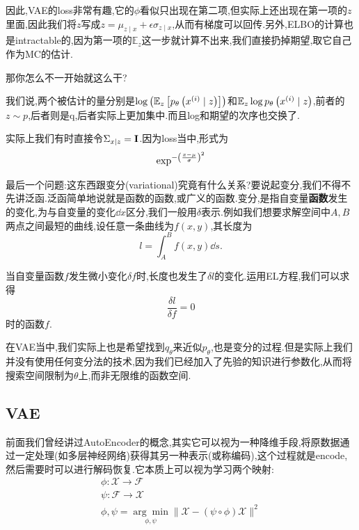	因此,VAE的loss非常有趣,它的$\phi$看似只出现在第二项,但实际上还出现在第一项的$z$里面,因此我们将$z$写成$z=\mu_{z \mid x}+\epsilon \sigma_{z \mid x}$,从而有梯度可以回传.另外,ELBO的计算也是intractable的,因为第一项的$\mathbb{E}_{z}$这一步就计算不出来,我们直接扔掉期望,取它自己作为MC的估计.
	
	那你怎么不一开始就这么干?
	
	我们说,两个被估计的量分别是$\log\left( \mathbb{E}_z \left[ p_{\theta} \left( x^{(i)}  \mid z\right)\right]\right)$和$\mathbb{E}_{z} \log p_{\theta} \left( x^{(i)}\mid z\right)$,前者的$z \sim p$,后者则是q,后者实际上更加集中.而且log和期望的次序也交换了.
	
	实际上我们有时直接令$\Sigma_{x \mid z} = \bold{I}$.因为loss当中,形式为
	\begin{equation}
		\exp^{-\left( \frac{x - \mu}{\sigma}\right)^2}
	\end{equation}
	
	最后一个问题:这东西跟变分(variational)究竟有什么关系?要说起变分,我们不得不先讲泛函.泛函简单地说就是函数的函数,或广义的函数.变分,是指自变量\textbf{函数}发生的变化,为与自变量的变化$\dd x$区分,我们一般用$\delta$表示.例如我们想要求解空间中$A, B$两点之间最短的曲线,设任意一条曲线为$f(x, y)$,其长度为
	\begin{equation}
		l = \int_{A}^{B} f(x,  y) \dd s.
	\end{equation}

	当自变量函数$f$发生微小变化$\delta f$时,长度也发生了$\delta l$的变化.运用EL方程,我们可以求得
	\begin{equation}
		\frac{\delta l}{\delta f} = 0
	\end{equation}
	时的函数$f$.
	
	在VAE当中,我们实际上也是希望找到$q_\theta$来近似$p_{\theta}$,也是变分的过程.但是实际上我们并没有使用任何变分法的技术,因为我们已经加入了先验的知识进行参数化,从而将搜索空间限制为$\theta$上,而非无限维的函数空间.
	
	
	\subsection{VAE}
	
	前面我们曾经讲过AutoEncoder的概念,其实它可以视为一种降维手段,将原数据通过一定处理(如多层神经网络)获得其另一种表示(或称编码),这个过程就是encode,然后需要时可以进行解码恢复.它本质上可以视为学习两个映射:
	\begin{equation}
		\begin{array}{l}
			\phi: \mathcal{X} \rightarrow \mathcal{F} \\
			\psi: \mathcal{F} \rightarrow \mathcal{X} \\
			\phi, \psi=\underset{\phi, \psi}{\arg \min }\|\mathcal{X}-(\psi \circ \phi) \mathcal{X}\|^{2}
		\end{array}
	\end{equation}
	
